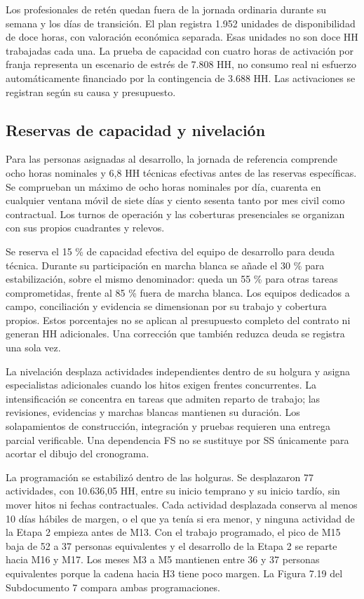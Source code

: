 \documentclass[11pt]{article}
\begin{document}
Los profesionales de retén quedan fuera de la jornada ordinaria durante su semana y los días de transición. El plan registra 1.952 unidades de disponibilidad de doce horas, con valoración económica separada. Esas unidades no son doce HH trabajadas cada una. La prueba de capacidad con cuatro horas de activación por franja representa un escenario de estrés de 7.808 HH, no consumo real ni esfuerzo automáticamente financiado por la contingencia de 3.688 HH. Las activaciones se registran según su causa y presupuesto.

\subsection{Reservas de capacidad y nivelación}

Para las personas asignadas al desarrollo, la jornada de referencia comprende ocho horas nominales y 6,8 HH técnicas efectivas antes de las reservas específicas. Se comprueban un máximo de ocho horas nominales por día, cuarenta en cualquier ventana móvil de siete días y ciento sesenta tanto por mes civil como contractual. Los turnos de operación y las coberturas presenciales se organizan con sus propios cuadrantes y relevos.

Se reserva el 15 \% de capacidad efectiva del equipo de desarrollo para deuda técnica. Durante su participación en marcha blanca se añade el 30 \% para estabilización, sobre el mismo denominador: queda un 55 \% para otras tareas comprometidas, frente al 85 \% fuera de marcha blanca. Los equipos dedicados a campo, conciliación y evidencia se dimensionan por su trabajo y cobertura propios. Estos porcentajes no se aplican al presupuesto completo del contrato ni generan HH adicionales. Una corrección que también reduzca deuda se registra una sola vez.

La nivelación desplaza actividades independientes dentro de su holgura y asigna especialistas adicionales cuando los hitos exigen frentes concurrentes. La intensificación se concentra en tareas que admiten reparto de trabajo; las revisiones, evidencias y marchas blancas mantienen su duración. Los solapamientos de construcción, integración y pruebas requieren una entrega parcial verificable. Una dependencia FS no se sustituye por SS únicamente para acortar el dibujo del cronograma.

La programación se estabilizó dentro de las holguras. Se desplazaron 77 actividades, con 10.636,05 HH, entre su inicio temprano y su inicio tardío, sin mover hitos ni fechas contractuales. Cada actividad desplazada conserva al menos 10 días hábiles de margen, o el que ya tenía si era menor, y ninguna actividad de la Etapa 2 empieza antes de M13. Con el trabajo programado, el pico de M15 baja de 52 a 37 personas equivalentes y el desarrollo de la Etapa 2 se reparte hacia M16 y M17. Los meses M3 a M5 mantienen entre 36 y 37 personas equivalentes porque la cadena hacia H3 tiene poco margen. La Figura 7.19 del Subdocumento 7 compara ambas programaciones.
\end{document}
